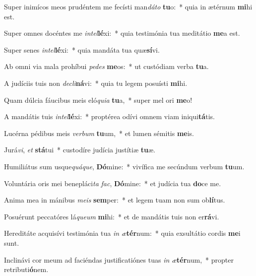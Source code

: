 \item Super inimícos meos prudéntem me fecísti man\textit{dá}\textit{to} \textbf{tu}o:~* quia in ætérnum \textbf{mi}hi est.
\item Super omnes docéntes me \textit{in}\textit{tel}\textbf{lé}xi:~* quia testimónia tua meditátio \textbf{me}a est.
\item Super senes \textit{in}\textit{tel}\textbf{lé}xi:~* quia mandáta tua quæ\textbf{sí}vi.
\item Ab omni via mala prohíbui \textit{pe}\textit{des} \textbf{me}os:~* ut custódiam verba \textbf{tu}a.
\item A judíciis tuis non \textit{de}\textit{cli}\textbf{ná}vi:~* quia tu legem posuísti \textbf{mi}hi.
\item Quam dúlcia fáucibus meis eló\textit{qui}\textit{a} \textbf{tu}a,~* super mel ori \textbf{me}o!
\item A mandátis tuis \textit{in}\textit{tel}\textbf{lé}xi:~* proptérea odívi omnem viam iniqui\textbf{tá}tis.
\item Lucérna pédibus meis \textit{ver}\textit{bum} \textbf{tu}um,~* et lumen sémitis \textbf{me}is.
\item Jurá\textit{vi}, \textit{et} \textbf{stá}tui~* custodíre judícia justítiæ \textbf{tu}æ.
\item Humiliátus sum usque\textit{quá}\textit{que}, \textbf{Dó}mine:~* vivífica me secúndum verbum \textbf{tu}um.
\item Voluntária oris mei benepláci\textit{ta} \textit{fac}, \textbf{Dó}mine:~* et judícia tua \textbf{do}ce me.
\item Anima mea in mánibus \textit{me}\textit{is} \textbf{sem}per:~* et legem tuam non sum ob\textbf{lí}tus.
\item Posuérunt peccatóres lá\textit{que}\textit{um} \textbf{mi}hi:~* et de mandátis tuis non er\textbf{rá}vi.
\item Hereditáte acquisívi testimónia tua \textit{in} \textit{æ}\textbf{tér}num:~* quia exsultátio cordis \textbf{me}i sunt.
\item Inclinávi cor meum ad faciéndas justificatiónes tuas \textit{in} \textit{æ}\textbf{tér}num,~* propter retributi\textbf{ó}nem.
